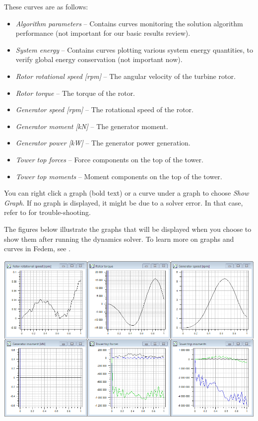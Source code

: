 These curves are as follows:

\begin{itemize}
\item{\sl Algorithm parameters} --
  Contains curves monitoring the solution algorithm performance
  (not important for our basic results review).
\item{\sl System energy} --
  Contains curves plotting various system energy quantities,
  to verify global energy conservation (not important now).
\item{\sl Rotor rotational speed [rpm]} --
  The angular velocity of the turbine rotor.
\item{\sl Rotor torque} --
  The torque of the rotor.
\item{\sl Generator speed [rpm]} --
  The rotational speed of the rotor.
\item{\sl Generator moment [kN]} --
  The generator moment.
\item{\sl Generator power [kW]} --
  The generator power generation.
\item{\sl Tower top forces} --
  Force components on the top of the tower.
\item{\sl Tower top moments} --
  Moment components on the top of the tower.
\end{itemize}

You can right click a graph (bold text) or a curve under a graph to choose
{\sl Show Graph}. If no graph is displayed, it might be due to a solver error.
In that case, refer to 
for trouble-shooting.

The figures below illustrate the graphs that will be displayed when you
choose to show them after running the dynamics solver. To learn more on
graphs and curves in Fedem, see .

\noindent\includegraphics[width=\textwidth]{Figures/3b-Graphs2}


